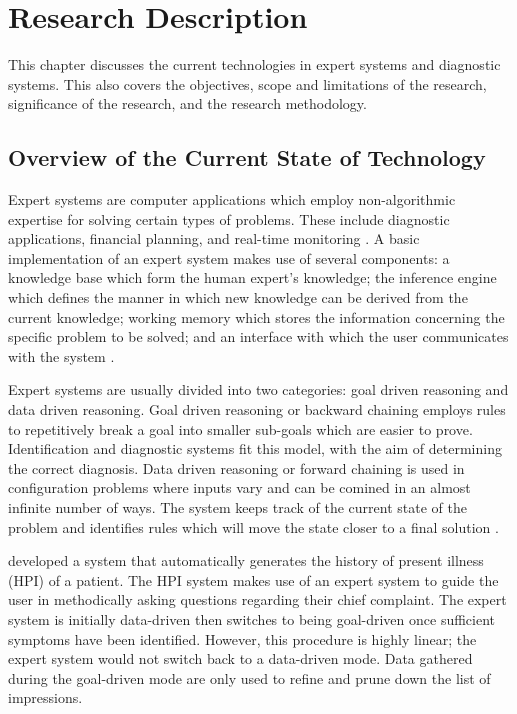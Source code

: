 %
%
%                 

\chapter{Research Description}
\label{sec:researchdesc}    %
This chapter discusses the current technologies in expert systems and diagnostic systems.
This also covers the objectives, scope and limitations of the research, significance of the research, and the research methodology.

\section{Overview of the Current State of Technology}
\label{sec:overview}
Expert systems are computer applications which employ non-algorithmic expertise for solving certain types of problems.
 These include diagnostic applications, financial planning, and real-time monitoring \cite{Merritt:2010}.
A basic implementation of an expert system makes use of several components:
a knowledge base which form the human expert's knowledge; 
the inference engine which defines the manner in which new knowledge can be derived from the current knowledge; 
working memory which stores the information concerning the specific problem to be solved; 
and an interface with which the user communicates with the system \cite{Agarwal:2014}. 

Expert systems are usually divided into two categories: goal driven reasoning and data driven reasoning. 
Goal driven reasoning or backward chaining employs rules to repetitively break a goal into smaller sub-goals which are easier to prove. 
Identification and diagnostic systems fit this model, with the aim of determining the correct diagnosis. 
Data driven reasoning or forward chaining is used in configuration problems where inputs vary and can be comined in an almost infinite number of ways. 
The system keeps track of the current state of the problem and identifies rules which will move the state closer to a final solution \cite{Merritt:2010}.

 developed a system that automatically generates the history of present illness (HPI) of a patient.
The HPI system makes use of an expert system to guide the user in methodically asking questions regarding their chief complaint. 
The expert system is initially data-driven then switches to being goal-driven once sufficient symptoms have been identified.
However, this procedure is highly linear; the expert system would not switch back to a data-driven mode.
Data gathered during the goal-driven mode are only used to refine and prune down the list of impressions.

